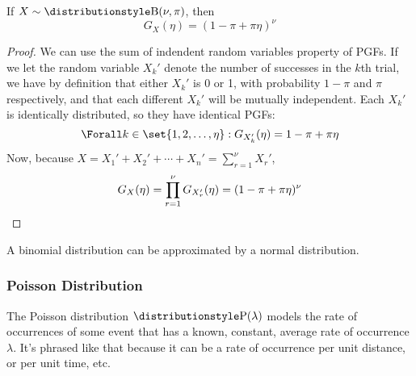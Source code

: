 \begin{lemma} \label{lem_binom_pgf}
 If \(X \sim \Binomial(\nu, \pi)\), then
 \begin{equation*}
 G_X(\eta) = (1 - \pi + \pi \eta)^\nu
 \end{equation*}
\end{lemma}
\begin{proof}
 We can use the sum of indendent random variables property of PGFs. If we let the
 random variable \(X_k'\) denote the number of successes in the \(k\)th trial, we
 have by definition that either \(X_k'\) is 0 or 1, with probability \(1 - \pi\)
 and \(\pi\) respectively, and that each different \(X_k'\) will be mutually
 independent. Each \(X_k'\) is identically distributed, so they have identical
 PGFs:
 \begin{equation*}
  \Forall k \in \set{1, 2, \dotsc, \eta}: G_{X_k'}(\eta) = 1 - \pi + \pi \eta
 \end{equation*}
 Now, because \(X = X_1' + X_2' + \dotsb + X_n' = \sum_{r = 1}^\nu X_r'\),
 \begin{equation*}
  G_X(\eta) = \prod_{r = 1}^\nu G_{X_r'}(\eta)
      = (1 - \pi + \pi \eta)^\nu \qedhere
 \end{equation*}
\end{proof}

A binomial distribution can be approximated by a normal distribution.

\subsubsection{Poisson Distribution}

The Poisson distribution \(\Poisson(\lambda)\) models the rate of occurrences of
some event that has a known, constant, average rate of occurrence \(\lambda\).
It's phrased like that because it can be a rate of occurrence per unit distance,
or per unit time, etc.

